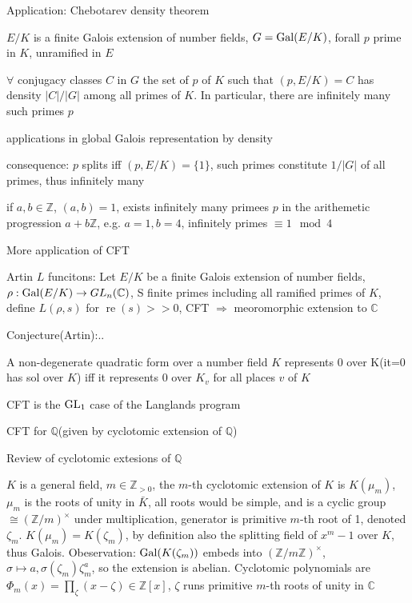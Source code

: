 \documentclass[main]{subfiles}
\begin{document}
Application: Chebotarev density theorem

$E/K$ is a finite Galois extension of number fields, $G=\operatorname{Gal}(E/K)$, forall $p$ prime in $K$, unramified in $E$

\begin{theorem}
$\forall$ conjugacy classes $C$ in $G$ the set of $p$ of $K$ such that $(p,E/K)=C$ has density $|C|/|G|$ among all primes of $K$. In particular, there are infinitely many such primes $p$
\end{theorem}

applications in global Galois representation by density

consequence: $p$ splits iff $(p,E/K)=\{1\}$, such primes constitute $1/|G|$ of all primes, thus infinitely many

\begin{theorem}
if $a,b\in \mathbb Z$, $(a,b)=1$, exists infinitely many primees $p$ in the arithemetic progression $a+b\mathbb Z$, e.g. $a=1,b=4$, infinitely primes $\equiv1\mod4$
\end{theorem}

More application of CFT

Artin $L$ funcitons: Let $E/K$ be a finite Galois extension of number fields, $\rho:\operatorname{Gal}(E/K)\to GL_n(\mathbb C)$, S finite primes including all ramified primes of $K$, define $L(\rho,s)$ for $\operatorname{re}(s)>>0$, CFT $\Rightarrow$ meoromorphic extension to $\mathbb C$

Conjecture(Artin):..

\begin{theorem}
A non-degenerate quadratic form over a number field $K$ represents 0 over K(it=0 has sol over $K$) iff it represents 0 over $K_v$ for all places $v$ of $K$
\end{theorem}

CFT is the $\operatorname{GL}_1$ case of the Langlands program

CFT for $\mathbb Q$(given by cyclotomic extension of $\mathbb Q$)

Review of cyclotomic extesions of $\mathbb Q$

$K$ is a general field, $m\in\mathbb Z_{>0}$, the $m$-th cyclotomic extension of $K$ is $K(\mu_m)$, $\mu_m$ is the roots of unity in $\bar K$, all roots would be simple, and is a cyclic group $\cong (\mathbb Z/m)^\times$ under multiplication, generator is primitive $m$-th root of 1, denoted $\zeta_m$. $K(\mu_m)=K(\zeta_m)$, by definition also the splitting field of $x^m-1$ over $K$, thus Galois. Obeservation: $\operatorname{Gal}(K(\zeta_m))$ embeds into $(\mathbb Z/m\mathbb Z)^\times$, $\sigma\mapsto a, \sigma(\zeta_m)\zeta_m^a$, so the extension is abelian. Cyclotomic polynomials are $\Phi_m(x)=\prod_\zeta(x-\zeta)\in \mathbb Z[x]$, $\zeta$ runs primitive $m$-th roots of unity in $\mathbb C$
\end{document}
